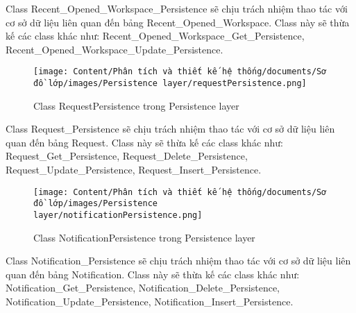 \par
Class Recent\_Opened\_Workspace\_Persistence sẽ chịu trách nhiệm thao tác với cơ sở dữ liệu
liên quan đến bảng Recent\_Opened\_Workspace. Class này sẽ thừa kế các class khác như:
Recent\_Opened\_Workspace\_Get\_Persistence, Recent\_Opened\_Workspace\_Update\_Persistence.
\begin{figure}[H]
    \centering
    \texttt{[image: Content/Phân tích và thiết kế hệ thống/documents/Sơ đồ lớp/images/Persistence layer/requestPersistence.png]}
    \vspace{0.5cm}
    \caption{Class RequestPersistence trong Persistence layer}
    \label{fig:Class RequestPersistence trong Persistence layer}
\end{figure}
\par
Class Request\_Persistence sẽ chịu trách nhiệm thao tác với cơ sở dữ liệu
liên quan đến bảng Request. Class này sẽ thừa kế các class khác như:
Request\_Get\_Persistence, Request\_Delete\_Persistence, Request\_Update\_Persistence, Request\_Insert\_Persistence.
\begin{figure}[H]
    \centering
    \texttt{[image: Content/Phân tích và thiết kế hệ thống/documents/Sơ đồ lớp/images/Persistence layer/notificationPersistence.png]}
    \vspace{0.5cm}
    \caption{Class NotificationPersistence trong Persistence layer}
    \label{fig:Class NotificationPersistence trong Persistence layer}
\end{figure}
\par
Class Notification\_Persistence sẽ chịu trách nhiệm thao tác với cơ sở dữ liệu
liên quan đến bảng Notification. Class này sẽ thừa kế các class khác như:
Notification\_Get\_Persistence, Notification\_Delete\_Persistence, Notification\_Update\_Persistence, Notification\_Insert\_Persistence.